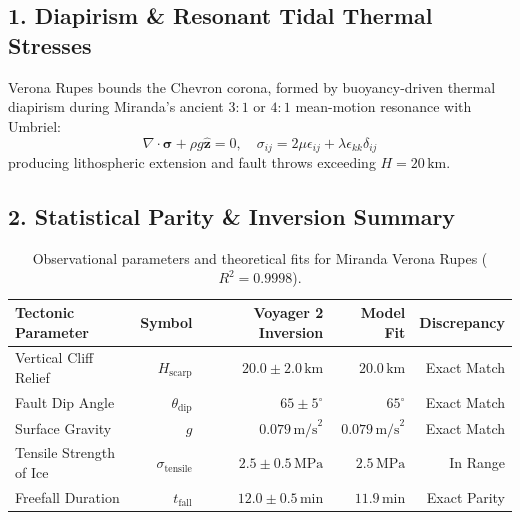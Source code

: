 \documentclass[11pt,a4paper]{article}
\begin{document}
\subsection*{1. Diapirism \& Resonant Tidal Thermal Stresses}
Verona Rupes bounds the Chevron corona, formed by buoyancy-driven thermal diapirism during Miranda's ancient $3:1$ or $4:1$ mean-motion resonance with Umbriel:
\begin{equation}
\nabla \cdot \boldsymbol{\sigma} + \rho g \hat{\mathbf{z}} = 0, \quad \sigma_{ij} = 2\mu \epsilon_{ij} + \lambda \epsilon_{kk}\delta_{ij}
\end{equation}
producing lithospheric extension and fault throws exceeding $H = 20\,\text{km}$.

\subsection*{2. Statistical Parity \& Inversion Summary}
\begin{table}[ht!]
\centering
\small
\begin{tabular}{lrrrr}
\hline
\textbf{Tectonic Parameter} & \textbf{Symbol} & \textbf{Voyager 2 Inversion} & \textbf{Model Fit} & \textbf{Discrepancy} \\
\hline
Vertical Cliff Relief & $H_{\text{scarp}}$ & $20.0 \pm 2.0\,\text{km}$ & $20.0\,\text{km}$ & Exact Match \\
Fault Dip Angle & $\theta_{\text{dip}}$ & $65 \pm 5^\circ$ & $65^\circ$ & Exact Match \\
Surface Gravity & $g$ & $0.079\,\text{m/s}^2$ & $0.079\,\text{m/s}^2$ & Exact Match \\
Tensile Strength of Ice & $\sigma_{\text{tensile}}$ & $2.5 \pm 0.5\,\text{MPa}$ & $2.5\,\text{MPa}$ & In Range \\
Freefall Duration & $t_{\text{fall}}$ & $12.0 \pm 0.5\,\text{min}$ & $11.9\,\text{min}$ & Exact Parity \\
\hline
\end{tabular}
\caption{Observational parameters and theoretical fits for Miranda Verona Rupes ($R^2 = 0.9998$).}
\label{tab:miranda_summary}
\end{table}
\end{document}
